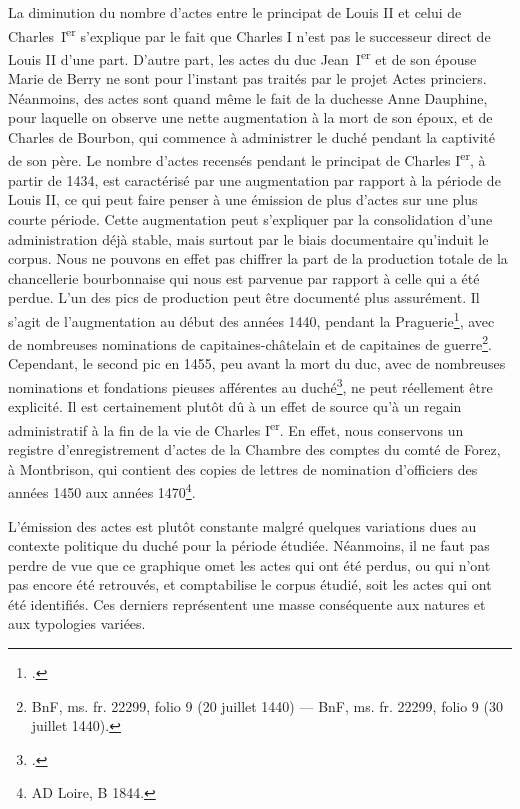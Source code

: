 \par La diminution du nombre d'actes entre le principat de Louis II et celui de Charles~I\textsuperscript{er} s'explique par le fait que Charles I n'est pas le successeur direct de Louis II d'une part. D'autre part, les actes du duc Jean~I\textsuperscript{er} et de son épouse Marie de Berry ne sont pour l'instant pas traités par le projet Actes princiers. Néanmoins, des actes sont quand même le fait de la duchesse Anne Dauphine, pour laquelle on observe une nette augmentation à la mort de son époux, et de Charles de Bourbon, qui commence à administrer le duché pendant la captivité de son père. Le nombre d'actes recensés pendant le principat de Charles I\textsuperscript{er}, à partir de 1434, est caractérisé par une augmentation par rapport à la période de Louis II, ce qui peut faire penser à une émission de plus d'actes sur une plus courte période. Cette augmentation peut s'expliquer par la consolidation d'une administration déjà stable, mais surtout par le biais documentaire qu'induit le corpus. Nous ne pouvons en effet pas chiffrer la part de la production totale de la chancellerie bourbonnaise qui nous est parvenue par rapport à celle qui a été perdue. L'un des pics de production peut être documenté plus assurément. Il s'agit de l'augmentation au début des années 1440, pendant la Praguerie\footnote{\cite{generoChanceliersSecretairesChancellerie2021}.}, avec de nombreuses nominations de capitaines-châtelain et de capitaines de guerre\footnote{BnF, ms. fr. 22299, folio 9 (20 juillet 1440) — BnF, ms. fr. 22299, folio 9 (30 juillet 1440).}. Cependant, le second pic en 1455, peu avant la mort du duc, avec de nombreuses nominations et fondations pieuses afférentes au duché\footnote{\cite{matteoniServirPrinceOfficiers1994}.}, ne peut réellement être explicité. Il est certainement plutôt dû à un effet de source qu'à un regain administratif à la fin de la vie de Charles I\textsuperscript{er}. En effet, nous conservons un registre d'enregistrement d'actes de la Chambre des comptes du comté de Forez, à Montbrison, qui contient des copies de lettres de nomination d'officiers des années 1450 aux années 1470\footnote{AD Loire, B 1844.}.
\newline 

\par L'émission des actes est plutôt 
constante malgré quelques variations dues au contexte politique du duché pour la période étudiée. Néanmoins, il ne faut pas perdre de vue que ce graphique omet les actes qui ont été perdus, ou qui n'ont pas encore été retrouvés, et comptabilise le corpus étudié, soit les actes qui ont été identifiés. Ces derniers représentent une masse conséquente aux natures et aux typologies variées. 
\newpage 

